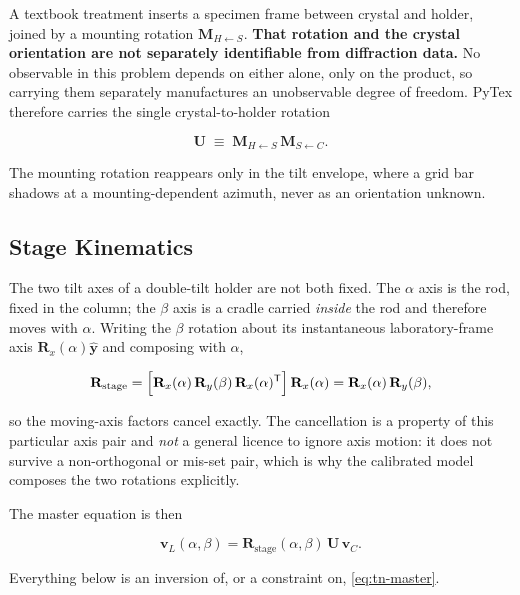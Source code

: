 A textbook treatment inserts a specimen frame between crystal and holder, joined by a mounting
rotation $\mathbf{M}_{H \leftarrow S}$. \textbf{That rotation and the crystal orientation are not
separately identifiable from diffraction data.} No observable in this problem depends on either
alone, only on the product, so carrying them separately manufactures an unobservable degree of
freedom. PyTex therefore carries the single crystal-to-holder rotation

\begin{equation}
\mathbf{U} \;\equiv\; \mathbf{M}_{H \leftarrow S}\,\mathbf{M}_{S \leftarrow C}.
\label{eq:tn-collapse}
\end{equation}

The mounting rotation reappears only in the tilt envelope, where a grid bar shadows at a
mounting-dependent azimuth, never as an orientation unknown.

\subsection{Stage Kinematics}

The two tilt axes of a double-tilt holder are not both fixed. The $\alpha$ axis is the rod, fixed
in the column; the $\beta$ axis is a cradle carried \emph{inside} the rod and therefore moves with
$\alpha$. Writing the $\beta$ rotation about its instantaneous laboratory-frame axis
$\mathbf{R}_x(\alpha)\hat{\mathbf{y}}$ and composing with $\alpha$,

\begin{equation}
\mathbf{R}_{\text{stage}}
= \Bigl[\mathbf{R}_x(\alpha)\,\mathbf{R}_y(\beta)\,\mathbf{R}_x(\alpha)^{\mathsf T}\Bigr]\,
  \mathbf{R}_x(\alpha)
= \mathbf{R}_x(\alpha)\,\mathbf{R}_y(\beta),
\label{eq:tn-stage}
\end{equation}

so the moving-axis factors cancel exactly. The cancellation is a property of this particular axis
pair and \emph{not} a general licence to ignore axis motion: it does not survive a non-orthogonal
or mis-set pair, which is why the calibrated model composes the two rotations explicitly.

The master equation is then

\begin{equation}
\mathbf{v}_L(\alpha,\beta) = \mathbf{R}_{\text{stage}}(\alpha,\beta)\,\mathbf{U}\,\mathbf{v}_C .
\label{eq:tn-master}
\end{equation}

Everything below is an inversion of, or a constraint on, \eqref{eq:tn-master}.


